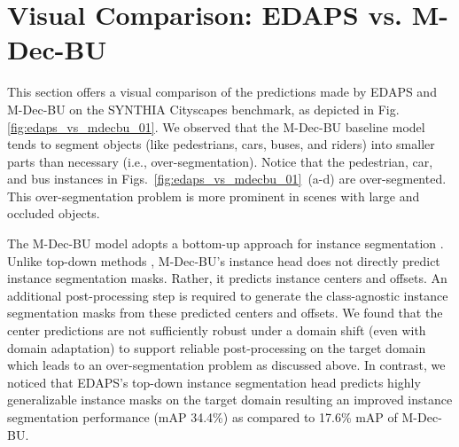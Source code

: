 \documentclass[10pt,twocolumn,letterpaper]{article}
\begin{document}
\section{Visual Comparison: EDAPS vs. M-Dec-BU}
\label{sec:mdecbu-analysis}
This section offers a visual comparison of the predictions made by EDAPS and M-Dec-BU on the SYNTHIA  Cityscapes benchmark, as depicted in Fig. \ref{fig:edaps_vs_mdecbu_01}.
We observed that the M-Dec-BU baseline model tends to segment objects (like 
pedestrians, cars, buses, and riders) into smaller parts than necessary (i.e., over-segmentation).
Notice that the pedestrian, car, and bus instances in Figs.~\ref{fig:edaps_vs_mdecbu_01}~(a-d) are over-segmented.
This over-segmentation problem is more prominent in scenes  with large and occluded objects.


The M-Dec-BU model adopts a bottom-up approach for instance segmentation \cite{cheng2019panoptic}.
Unlike top-down methods \cite{he2017mask}, M-Dec-BU's instance head does not directly predict instance segmentation masks.
Rather, it predicts instance centers and offsets.
An additional post-processing step is required to generate the class-agnostic instance segmentation masks 
from these predicted centers and offsets.
We found that the center predictions are not sufficiently robust under a domain shift (even with domain adaptation) to support reliable post-processing on the target domain which leads to an over-segmentation problem as discussed above.
In contrast, we noticed that EDAPS's top-down instance segmentation head 
predicts highly generalizable instance masks on the target domain
resulting an improved instance segmentation performance (mAP 34.4\%) as
compared to 17.6\% mAP of M-Dec-BU.
\end{document}
